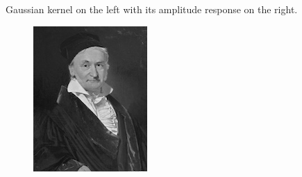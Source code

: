 \documentclass[]{article}
\begin{document}
\begin{figure}
\begin{subfigure}[t]{0.49\textwidth}
    \end{subfigure}
    \caption{Gaussian kernel on the left with its amplitude response on the
    right.}
\end{figure}

\begin{figure}
  \label{fig:gaussian-input-output}
  \centering
    \begin{subfigure}[t]{0.49\textwidth}
      \centering
      \includegraphics[width=0.99\linewidth]{input.png}
    \end{subfigure}
    \begin{subfigure}[t]{0.49\textwidth}
      \centering

\end{subfigure}
\end{figure}
\end{document}
